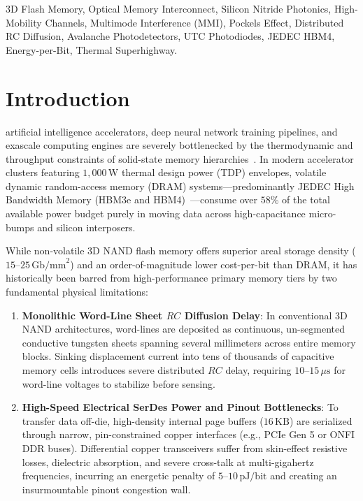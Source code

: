 \documentclass[journal]{IEEEtran}
\begin{document}
\begin{IEEEkeywords}
3D Flash Memory, Optical Memory Interconnect, Silicon Nitride Photonics, High-Mobility Channels, Multimode Interference (MMI), Pockels Effect, Distributed RC Diffusion, Avalanche Photodetectors, UTC Photodiodes, JEDEC HBM4, Energy-per-Bit, Thermal Superhighway.
\end{IEEEkeywords}

\section{Introduction}
 artificial intelligence accelerators, deep neural network training pipelines, and exascale computing engines are severely bottlenecked by the thermodynamic and throughput constraints of solid-state memory hierarchies~\cite{wulf1995hitting,jouppi2021ten}. In modern accelerator clusters featuring $1,000\,\text{W}$ thermal design power (TDP) envelopes, volatile dynamic random-access memory (DRAM) systems---predominantly JEDEC High Bandwidth Memory (HBM3e and HBM4)~\cite{jedec_hbm4}---consume over $58\%$ of the total available power budget purely in moving data across high-capacitance micro-bumps and silicon interposers. 

While non-volatile 3D NAND flash memory offers superior areal storage density ($15$--$25\,\text{Gb/mm}^2$) and an order-of-magnitude lower cost-per-bit than DRAM, it has historically been barred from high-performance primary memory tiers by two fundamental physical limitations:
\begin{enumerate}
    \item \textbf{Monolithic Word-Line Sheet $RC$ Diffusion Delay}: In conventional 3D NAND architectures, word-lines are deposited as continuous, un-segmented conductive tungsten sheets spanning several millimeters across entire memory blocks. Sinking displacement current into tens of thousands of capacitive memory cells introduces severe distributed $RC$ delay, requiring $10$--$15\,\mu\text{s}$ for word-line voltages to stabilize before sensing.
    \item \textbf{High-Speed Electrical SerDes Power and Pinout Bottlenecks}: To transfer data off-die, high-density internal page buffers ($16\,\text{KB}$) are serialized through narrow, pin-constrained copper interfaces (e.g., PCIe Gen 5 or ONFI DDR buses). Differential copper transceivers suffer from skin-effect resistive losses, dielectric absorption, and severe cross-talk at multi-gigahertz frequencies, incurring an energetic penalty of $5$--$10\,\text{pJ/bit}$ and creating an insurmountable pinout congestion wall.
\end{enumerate}
\end{document}
